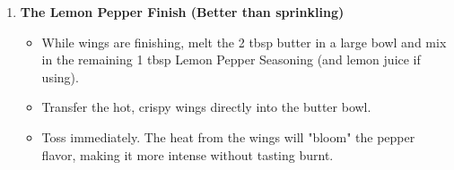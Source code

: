 \begin{enumerate}
    \item \textbf{The Lemon Pepper Finish (Better than sprinkling)}
          \begin{itemize}[label=--]
              \item While wings are finishing, melt the 2 tbsp butter in a large bowl and mix in the remaining 1 tbsp Lemon Pepper Seasoning (and lemon juice if using).
              \item Transfer the hot, crispy wings directly into the butter bowl.
              \item Toss immediately. The heat from the wings will "bloom" the pepper flavor, making it more intense without tasting burnt.
          \end{itemize}

\end{enumerate}


